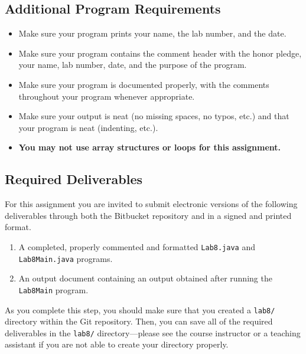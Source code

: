 \vspace{-0.05in}
\subsection*{Additional Program Requirements}
\vspace{-0.05in}
\begin{itemize}
\item Make sure your program prints your name, the lab number, and the date. 
\item Make sure your program contains the comment header with the honor pledge, your name, lab number, date, and the purpose of the program. 
\item Make sure your program is documented properly, with the comments throughout your program whenever appropriate. 
\item Make sure your output
is neat (no missing spaces, no typos, etc.) and that your program is neat (indenting, etc.).
\item \textbf{You may not use array structures or loops for this assignment.}
\end{itemize}

\vspace{-0.2in}
\subsection*{Required Deliverables}
\vspace{-0.05in}

For this assignment you are invited to submit electronic versions of the following deliverables through both the Bitbucket
repository and in a signed and printed format.

\vspace{-0.05in}
\begin{enumerate}
		\item A completed, properly commented and formatted {\tt Lab8.java} and {\tt Lab8Main.java} programs.

        \item An output document containing an output obtained after running the {\tt Lab8Main} program.
        
\end{enumerate}
\vspace{-0.05in}

\noindent As you complete this step, you should make sure that you
created a {\tt lab8/} directory within the Git repository.  Then, you can save all of the required deliverables in the
{\tt lab8/} directory---please see the course instructor or a teaching assistant if you are not able to create your
directory properly. 

